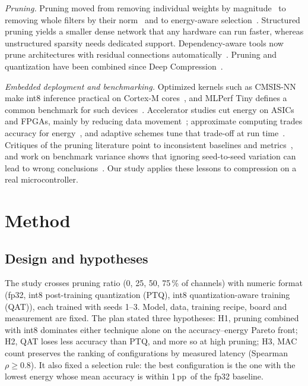 \documentclass[conference]{IEEEtran}
\newcommand{\pp}{\,pp}
\begin{document}
\textit{Pruning.} Pruning moved from removing individual weights by magnitude~\cite{han2015learning} to removing whole filters by their norm~\cite{li2017pruning} and to energy-aware selection~\cite{yang2017energy}. Structured pruning yields a smaller dense network that any hardware can run faster, whereas unstructured sparsity needs dedicated support. Dependency-aware tools now prune architectures with residual connections automatically~\cite{fang2023depgraph}. Pruning and quantization have been combined since Deep Compression~\cite{han2016deep}.

\textit{Embedded deployment and benchmarking.} Optimized kernels such as CMSIS-NN make int8 inference practical on Cortex-M cores~\cite{lai2018cmsisnn}, and MLPerf Tiny defines a common benchmark for such devices~\cite{banbury2021mlperftiny}. Accelerator studies cut energy on ASICs and FPGAs, mainly by reducing data movement~\cite{chen2017eyeriss,peccia2024gemmini}; approximate computing trades accuracy for energy~\cite{moons2016energy}, and adaptive schemes tune that trade-off at run time~\cite{jayakodi2018trading,hemmat2021airnn}. Critiques of the pruning literature point to inconsistent baselines and metrics~\cite{blalock2020state}, and work on benchmark variance shows that ignoring seed-to-seed variation can lead to wrong conclusions~\cite{bouthillier2021variance}. Our study applies these lessons to compression on a real microcontroller.

\section{Method}

\subsection{Design and hypotheses}
The study crosses pruning ratio (0, 25, 50, 75\,\% of channels) with numeric format (fp32, int8 post-training quantization (PTQ), int8 quantization-aware training (QAT)), each trained with seeds 1--3. Model, data, training recipe, board and measurement are fixed. The plan stated three hypotheses: H1, pruning combined with int8 dominates either technique alone on the accuracy--energy Pareto front; H2, QAT loses less accuracy than PTQ, and more so at high pruning; H3, MAC count preserves the ranking of configurations by measured latency (Spearman $\rho \geq 0.8$). It also fixed a selection rule: the best configuration is the one with the lowest energy whose mean accuracy is within 1\pp\ of the fp32 baseline.
\end{document}
